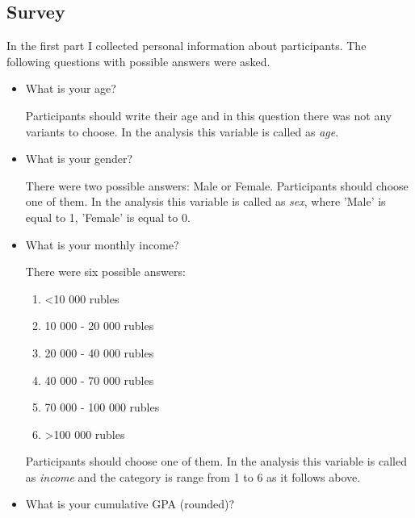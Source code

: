\documentclass[12pt]{article}
\begin{document}
	\subsection{Survey}
	In the first part I collected personal information about participants. The following questions with possible answers were asked.

	\begin{itemize}\vspace{-0.2cm}
		\item What is your age?
		
		Participants should write their age and in this question there was not any variants to choose. In the analysis this variable is called as  \textit{age}.
		\vspace{-0.2cm}
		\item What is your gender? 
		
		There were two possible answers: Male or Female. Participants should choose one of them. In the analysis this variable is called as  \textit{sex}, where 'Male' is equal to 1, 'Female' is equal to 0.
		\vspace{-0.2cm}
		\item What is your monthly income?
		
		There were six possible answers:
		\vspace{-0.3cm}
			\begin{enumerate}
				\item <10 000 rubles \vspace{-0.2cm}
				\item 10 000 - 20 000 rubles \vspace{-0.2cm}
				\item 20 000 - 40 000 rubles \vspace{-0.2cm}
				\item 40 000 - 70 000 rubles \vspace{-0.2cm}
				\item 70 000 - 100 000 rubles \vspace{-0.2cm}
				\item >100 000 rubles \vspace{-0.2cm}
			\end{enumerate}
	
	Participants should choose one of them. In the analysis this variable is called as \textit{income} and the category is range from 1 to 6 as it follows above.
	
	\item What is your cumulative GPA (rounded)?
	

\end{itemize}
\end{document}
